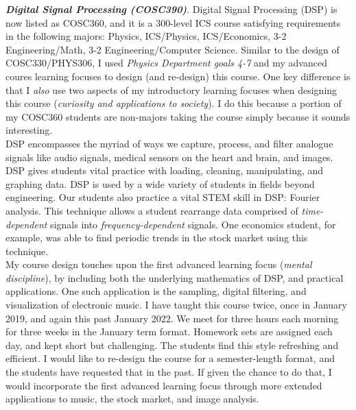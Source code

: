 \documentclass[../../../main.tex]{subfiles}
\begin{document}
\textbf{\textit{Digital Signal Processing (COSC390)}}.  Digital Signal Processing (DSP) is now listed as COSC360, and it is a 300-level ICS course satisfying requirements in the following majors: Physics, ICS/Physics, ICS/Economics, 3-2 Engineering/Math, 3-2 Engineering/Computer Science.  Similar to the design of COSC330/PHYS306, I used \textit{Physics Department goals 4-7} and my advanced coures learning focuses to design (and re-design) this course.  One key difference is that I \textit{also} use two aspects of my introductory learning focuses when designing this course (\textit{curiosity and applications to society}).  I do this because a portion of my COSC360 students are non-majors taking the course simply because it sounds interesting.
\\
\vspace{0.15cm}
DSP encompasses the myriad of ways we capture, process, and filter analogue signals like audio signals, medical sensors on the heart and brain, and images.  DSP gives students vital practice with loading, cleaning, manipulating, and graphing data.  DSP is used by a wide variety of students in fields beyond engineering.  Our students also practice a vital STEM skill in DSP: Fourier analysis.  This technique allows a student rearrange data comprised of \textit{time-dependent} signals into \textit{frequency-dependent} signals.  One economics student, for example, was able to find periodic trends in the stock market using this technique.
\\
\vspace{0.15cm}
My course design touches upon the first advanced learning focus (\textit{mental discipline}), by including both the underlying mathematics of DSP, and practical applications.  One such application is the sampling, digital filtering, and visualization of electronic music.  I have taught this course twice, once in January 2019, and again this past January 2022.  We meet for three hours each morning for three weeks in the January term format.  Homework sets are assigned each day, and kept short but challenging.  The students find this style refreshing and efficient.  I would like to re-design the course for a semester-length format, and the students have requested that in the past.  If given the chance to do that, I would incorporate the first advanced learning focus through more extended applications to music, the stock market, and image analysis.
\\
\vspace{0.15cm}
\end{document}
